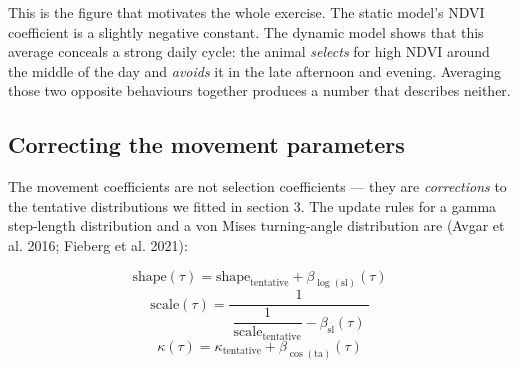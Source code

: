 \documentclass[
  letterpaper,
  DIV=11,
  numbers=noendperiod]{scrartcl}
\begin{document}
This is the figure that motivates the whole exercise. The static model's
NDVI coefficient is a slightly negative constant. The dynamic model
shows that this average conceals a strong daily cycle: the animal
\emph{selects} for high NDVI around the middle of the day and
\emph{avoids} it in the late afternoon and evening. Averaging those two
opposite behaviours together produces a number that describes neither.

\subsection{Correcting the movement
parameters}\label{correcting-the-movement-parameters}

The movement coefficients are not selection coefficients --- they are
\emph{corrections} to the tentative distributions we fitted in section
3. The update rules for a gamma step-length distribution and a von Mises
turning-angle distribution are (Avgar et al. 2016; Fieberg et al. 2021):

\[
\text{shape}(\tau) = \text{shape}_{\text{tentative}} + \beta_{\log(\text{sl})}(\tau)
\] \[
\text{scale}(\tau) = \frac{1}{\ \dfrac{1}{\text{scale}_{\text{tentative}}} - \beta_{\text{sl}}(\tau)\ }
\] \[
\kappa(\tau) = \kappa_{\text{tentative}} + \beta_{\cos(\text{ta})}(\tau)
\]
\end{document}
